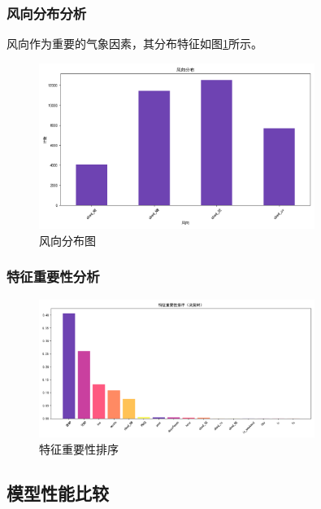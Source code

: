 \subsubsection{风向分布分析}
风向作为重要的气象因素，其分布特征如图\ref{fig:wind_direction}所示。

\begin{figure}[H]
    \centering
    \includegraphics[width=0.8\textwidth]{images/wind_direction_distribution}
    \caption{风向分布图}
    \label{fig:wind_direction}
\end{figure}

\subsubsection{特征重要性分析}
\begin{figure}[H]
    \centering
    \includegraphics[width=0.8\textwidth]{images/decision_tree/feature_importance.png}
    \caption{特征重要性排序}
    \label{fig:feature_importance}
\end{figure}

\subsection{模型性能比较}
